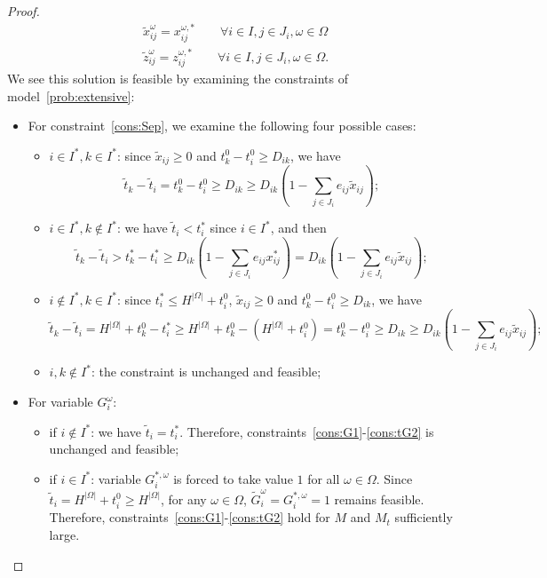 \documentclass[11pt]{article}
\begin{document}
{\begin{proof}
\begin{subequations}
\begin{align}
				& \tilde{x}_{ij}^\omega = x_{ij}^{\omega,*} \qquad \forall i \in I, j \in J_i, \omega \in \Omega \\
				& \tilde{z}_{ij}^\omega = z_{ij}^{\omega,*} \qquad \forall i \in I, j \in J_i, \omega \in \Omega.
				\end{align}
			\end{subequations}
			We see this solution is feasible by examining the constraints of model~\eqref{prob:extensive}:
			\begin{itemize}
				\item For constraint~\eqref{cons:Sep}, we examine the following four possible cases:
				\begin{itemize}
					\item \(i \in I^*, k \in I^*\): since \(\tilde{x}_{ij} \geq 0\) and \(t_k^0 - t_i^0 \geq D_{ik}\), we have \[\tilde{t}_k - \tilde{t}_i  = t_k^0 - t_i^0 \geq D_{ik} \geq D_{ik} \left(1 - \sum_{j \in J_i} e_{ij} \tilde{x}_{ij} \right);\]
					\item \(i \in I^*, k \notin I^*\): we have \(\tilde{t}_i < t_i^*\) since \(i \in I^*\), and then \[\tilde{t}_k - \tilde{t}_i > t_k^* - t_i^* \geq D_{ik} \left( 1 - \sum_{j \in J_i} e_{ij} x^*_{ij} \right) = D_{ik} \left(1 - \sum_{j \in J_i} e_{ij} \tilde{x}_{ij} \right);\]
					\item \(i \notin I^*, k \in I^*\): since \(t_i^* \leq H^{|\Omega|} + t_i^0\), \(\tilde{x}_{ij} \geq 0\) and \(t_k^0 - t_i^0 \geq D_{ik}\), we have
					\[\tilde{t}_k - \tilde{t}_i = H^{|\Omega|} + t_k^0 - t_i^* \geq H^{|\Omega|} + t_k^0 - \left(H^{|\Omega|} + t_i^0 \right) = t_k^0 - t_i^0 \geq D_{ik} \geq D_{ik} \left (1 - \sum_{j \in J_i} e_{ij} \tilde{x}_{ij} \right ); \]
					\item \(i,k \notin I^*\): the constraint is unchanged and feasible;
				\end{itemize}
				\item For variable \(G_i^\omega\):
				\begin{itemize}
					\item if \(i \notin I^*\): we have \(\tilde{t}_i = t_i^*\). Therefore, constraints~\eqref{cons:G1}-\eqref{cons:tG2} is unchanged and feasible;
					\item if \(i \in I^*\): variable \(G_i^{*,\omega}\) is forced to take value \(1\) for all \(\omega \in \Omega\). Since \(\tilde{t}_i = H^{|\Omega|} + t_i^0 \geq H^{|\Omega|}\), for any \(\omega \in \Omega\), \(\tilde{G}_i^\omega = G_i^{*,\omega} = 1\) remains feasible. Therefore, constraints~\eqref{cons:G1}-\eqref{cons:tG2} hold for $M$ and $M_t$ sufficiently large.

\end{itemize}
\end{itemize}
\end{proof}}
\end{document}
